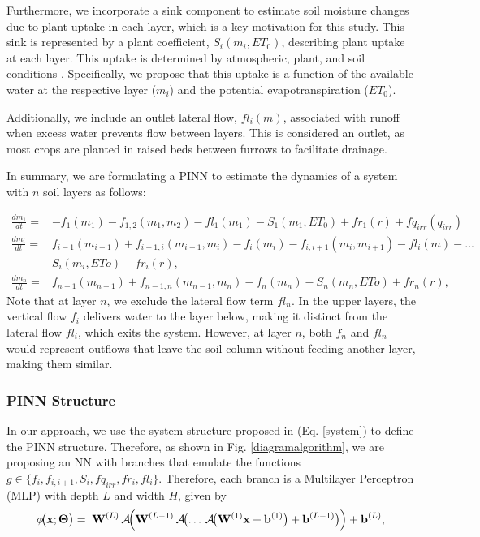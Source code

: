 \documentclass[pdflatex,sn-nature]{sn-jnl}%
\theoremstyle{thmstyleone}%
\theoremstyle{thmstyletwo}%
\theoremstyle{thmstylethree}%
\begin{document}
Furthermore, we incorporate a sink component to estimate soil moisture changes due to plant uptake in each layer, which is a key motivation for this study. This sink is represented by a plant coefficient, $S_i (m_i, ET_0)$, describing plant uptake at each layer. This uptake is determined by atmospheric, plant, and soil conditions \cite{swap2024}. Specifically, we propose that this uptake is a function of the available water at the respective layer ($m_i$) and the potential evapotranspiration ($ET_0$).

Additionally, we include an outlet lateral flow, $fl_i (m)$, associated with runoff when excess water prevents flow between layers. This is considered an outlet, as most crops are planted in raised beds between furrows to facilitate drainage.

In summary, we are formulating a PINN to estimate the dynamics of a system with $n$ soil layers as follows:

\begin{equation}
\label{system}
\begin{aligned}
\frac{d{m}_1}{dt} = & - f_1({m}_1) - f_{1,2}({m}_1,{m}_2) - fl_1 (m_1) - S_1({m}_1, ET_0) + fr_1(r) + fq_{irr}(q_{irr})\\
\frac{d{m}_i}{dt} = & f_{i-1}({m}_{i-1}) + f_{i-1,i}({m}_{i-1},{m}_i) - f_i({m}_i)- f_{i,i+1}({m}_i,{m}_{i+1}) - fl_i (m) - . . .\\ 
 & S_i({m}_i, ETo) + fr_i(r), \\
\frac{d{m}_n}{dt} = & f_{n-1}({m}_{n-1}) + f_{n-1,n}({m}_{n-1},{m}_n) - f_n({m}_n)    - S_n({m}_n, ETo) + fr_n(r),
\end{aligned}
\end{equation}
Note that at layer $n$, we exclude the lateral flow term $fl_n$. In the upper layers, the vertical flow $f_i$ delivers water to the layer below, making it distinct from the lateral flow $fl_i$, which exits the system. However, at layer $n$, both $f_n$ and $fl_n$ would represent outflows that leave the soil column without feeding another layer, making them similar.

\subsubsection{PINN Structure}
In our approach, we use the system structure proposed in (Eq. \eqref{system}) to define the PINN structure. Therefore, as shown in Fig. \ref{diagramalgorithm}, we are proposing an NN with branches that emulate the functions \( g \in \{f_i, f_{i,i+1}, S_i, fq_{irr}, fr_i,fl_i\} \). Therefore, each branch is a Multilayer Perceptron (MLP) with depth \( L \) and width \( H \), given by
\begin{equation}
\phi\!\bigl(\mathbf{x}; \boldsymbol{\Theta}\bigr)
  =\;
  \mathbf{W}^{(L)}
  \,\mathcal{A}\!\Bigl(
     \mathbf{W}^{(L-1)}
     \,\mathcal{A}\!\bigl(
        \dots
        \,\mathcal{A}\!\bigl(
           \mathbf{W}^{(1)}\mathbf{x}
           +\mathbf{b}^{(1)}
        \bigr)
        +\mathbf{b}^{(L-1)}
     \bigr)
  \Bigr)
  +\mathbf{b}^{(L)},
\label{eq:mlp}
\end{equation}
\end{document}
